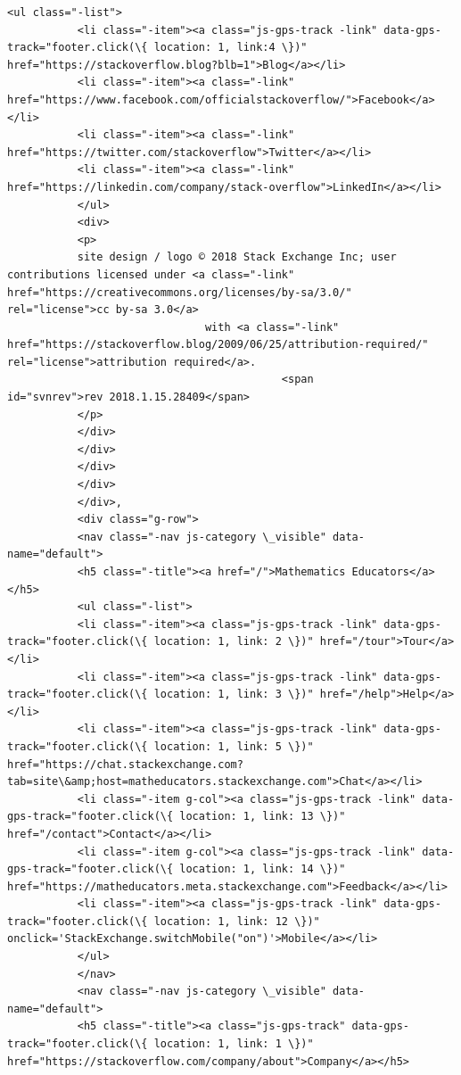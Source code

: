 \documentclass[11pt]{article}
\begin{document}
\begin{Verbatim}[commandchars=\\\{\}]
           <ul class="-list">
           <li class="-item"><a class="js-gps-track -link" data-gps-track="footer.click(\{ location: 1, link:4 \})" href="https://stackoverflow.blog?blb=1">Blog</a></li>
           <li class="-item"><a class="-link" href="https://www.facebook.com/officialstackoverflow/">Facebook</a></li>
           <li class="-item"><a class="-link" href="https://twitter.com/stackoverflow">Twitter</a></li>
           <li class="-item"><a class="-link" href="https://linkedin.com/company/stack-overflow">LinkedIn</a></li>
           </ul>
           <div>
           <p>
           site design / logo © 2018 Stack Exchange Inc; user contributions licensed under <a class="-link" href="https://creativecommons.org/licenses/by-sa/3.0/" rel="license">cc by-sa 3.0</a>
                               with <a class="-link" href="https://stackoverflow.blog/2009/06/25/attribution-required/" rel="license">attribution required</a>.
                                           <span id="svnrev">rev 2018.1.15.28409</span>
           </p>
           </div>
           </div>
           </div>
           </div>
           </div>,
           <div class="g-row">
           <nav class="-nav js-category \_visible" data-name="default">
           <h5 class="-title"><a href="/">Mathematics Educators</a></h5>
           <ul class="-list">
           <li class="-item"><a class="js-gps-track -link" data-gps-track="footer.click(\{ location: 1, link: 2 \})" href="/tour">Tour</a></li>
           <li class="-item"><a class="js-gps-track -link" data-gps-track="footer.click(\{ location: 1, link: 3 \})" href="/help">Help</a></li>
           <li class="-item"><a class="js-gps-track -link" data-gps-track="footer.click(\{ location: 1, link: 5 \})" href="https://chat.stackexchange.com?tab=site\&amp;host=matheducators.stackexchange.com">Chat</a></li>
           <li class="-item g-col"><a class="js-gps-track -link" data-gps-track="footer.click(\{ location: 1, link: 13 \})" href="/contact">Contact</a></li>
           <li class="-item g-col"><a class="js-gps-track -link" data-gps-track="footer.click(\{ location: 1, link: 14 \})" href="https://matheducators.meta.stackexchange.com">Feedback</a></li>
           <li class="-item"><a class="js-gps-track -link" data-gps-track="footer.click(\{ location: 1, link: 12 \})" onclick='StackExchange.switchMobile("on")'>Mobile</a></li>
           </ul>
           </nav>
           <nav class="-nav js-category \_visible" data-name="default">
           <h5 class="-title"><a class="js-gps-track" data-gps-track="footer.click(\{ location: 1, link: 1 \})" href="https://stackoverflow.com/company/about">Company</a></h5>

\end{Verbatim}
\end{document}
